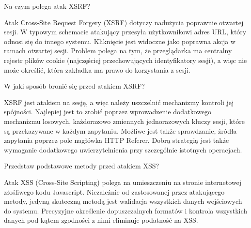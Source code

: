 \documentclass[answers,11pt]{exam}
\begin{document}
\begin{questions}
\question Na czym polega atak XSRF?
\begin{solution}
Atak Cross-Site Request Forgery (XSRF) dotyczy nadużycia poprawnie otwartej sesji. W typowym schemacie atakujący przesyła użytkownikowi adres URL, który odnosi się do innego systemu. Kliknięcie jest widoczne jako poprawna akcja w ramach otwartej sesji. Problem polega na tym, że przeglądarka ma centralny rejestr plików cookie (najczęściej przechowujących identyfikatory sesji), a więc nie może określić, która zakładka ma prawo do korzystania z sesji. 
\end{solution}

\question W jaki sposób bronić się przed atakiem XSRF?
\begin{solution}
XSRF jest atakiem na sesję, a więc należy uszczelnić mechanizmy kontroli jej spójności. Najlepiej jest to zrobić poprzez wprowadzenie dodatkowego mechanizmu losowych, każdorazowo zmiennych jednorazowych kluczy sesji, które są przekazywane w każdym zapytaniu. Możliwe jest także sprawdzanie, źródła zapytania poprzez pole nagłówka HTTP Referer. Dobrą strategią jest także wymaganie dodatkowego uwierzytelnienia przy szczególnie istotnych operacjach. 
\end{solution}


\question Przedstaw podstawowe metody przed atakiem XSS?
\begin{solution}
Atak XSS (Cross-Site Scripting) polega na umieszczeniu na stronie internetowej złośliwego kodu Javascript. Niezależnie od zastosowanej przez atakującego metody, jedyną skuteczną metodą jest walidacja wszystkich danych wejściowych do systemu. Precyzyjne określenie dopuszczalnych formatów i kontrola wszystkich danych pod kątem zgodności z nimi eliminuje podatność na XSS.  
\end{solution}


\end{questions}
\end{document}
